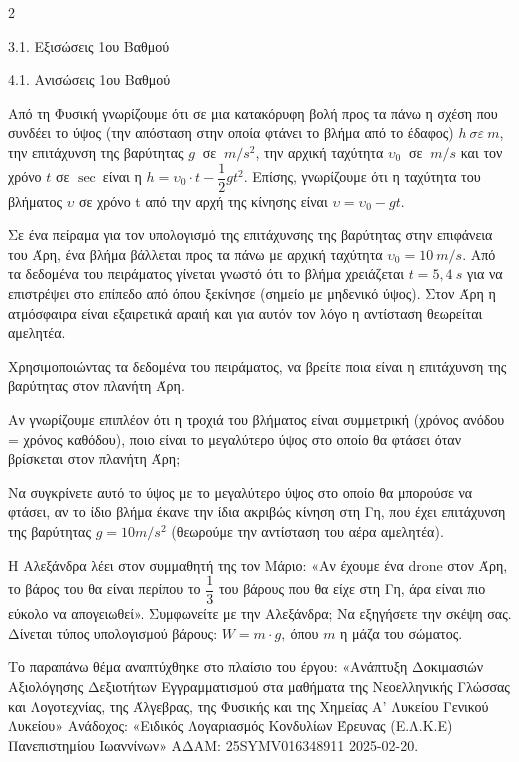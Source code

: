 \begin{ylh}{2}
    \item 3.1. Εξισώσεις 1ου Βαθμού
    \item 4.1. Ανισώσεις 1ου Βαθμού
\end{ylh}
Από τη Φυσική γνωρίζουμε ότι σε μια κατακόρυφη βολή προς τα πάνω η σχέση που συνδέει το ύψος (την απόσταση στην οποία φτάνει το βλήμα από το έδαφος) $h\ \sigma\varepsilon\ m$, την επιτάχυνση της βαρύτητας $g\ $ σε $\ m/s^{2}$, την αρχική ταχύτητα $\upsilon_{0}\ $ σε $\ m/s$ και τον χρόνο $t$ σε $\sec\ $είναι η $h = \upsilon_{0} \cdot t - \dfrac{1}{2}gt^{2}$. Επίσης, γνωρίζουμε ότι η ταχύτητα του βλήματος $\upsilon$ σε χρόνο t από την αρχή της κίνησης είναι ${\upsilon = \upsilon}_{0} - gt$.

Σε ένα πείραμα για τον υπολογισμό της επιτάχυνσης της βαρύτητας στην επιφάνεια του Άρη, ένα βλήμα βάλλεται προς τα πάνω με αρχική ταχύτητα $\upsilon_{0} = 10\ m/s$. Από τα δεδομένα του πειράματος γίνεται γνωστό ότι το βλήμα χρειάζεται $t = 5,4\ s$ για να επιστρέψει στο επίπεδο από όπου ξεκίνησε (σημείο με μηδενικό ύψος). Στον Άρη η ατμόσφαιρα είναι εξαιρετικά αραιή και για αυτόν τον λόγο η αντίσταση θεωρείται αμελητέα.

\begin{alist}
\item Χρησιμοποιώντας τα δεδομένα του πειράματος, να βρείτε ποια είναι η επιτάχυνση της βαρύτητας στον πλανήτη Άρη.
\item \begin{alist}
\item Αν γνωρίζουμε επιπλέον ότι η τροχιά του βλήματος είναι συμμετρική (χρόνος ανόδου = χρόνος καθόδου), ποιο είναι το μεγαλύτερο ύψος στο οποίο θα φτάσει όταν βρίσκεται στον πλανήτη Άρη;
\item
  Να συγκρίνετε αυτό το ύψος με το μεγαλύτερο ύψος στο οποίο θα μπορούσε να φτάσει, αν το ίδιο βλήμα έκανε την ίδια ακριβώς κίνηση στη Γη, που έχει επιτάχυνση της βαρύτητας $g = 10m/s^{2}$ (θεωρούμε την αντίσταση του αέρα αμελητέα). 
\end{alist}
\item Η Αλεξάνδρα λέει στον συμμαθητή της τον Μάριο: «Αν έχουμε ένα drone στον Άρη, το βάρος του θα είναι περίπου το $\dfrac{1}{3}$ του βάρους που θα είχε στη Γη, άρα είναι πιο εύκολο να απογειωθεί». Συμφωνείτε με την Αλεξάνδρα; Να εξηγήσετε την σκέψη σας.
Δίνεται τύπος υπολογισμού βάρους: $W = m \cdot g,\ $όπου $m$ η μάζα του σώματος.

{\footnotesize Το παραπάνω θέμα αναπτύχθηκε στο πλαίσιο του έργου: «Ανάπτυξη Δοκιμασιών Αξιολόγησης Δεξιοτήτων Εγγραμματισμού στα μαθήματα της Νεοελληνικής Γλώσσας και Λογοτεχνίας, της Άλγεβρας, της Φυσικής και της Χημείας Α' Λυκείου Γενικού Λυκείου» Ανάδοχος: «Ειδικός Λογαριασμός Κονδυλίων Έρευνας (Ε.Λ.Κ.Ε) Πανεπιστημίου Ιωαννίνων» ΑΔΑΜ: 25SYMV016348911 2025-02-20.}
\end{alist}

